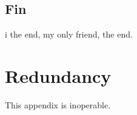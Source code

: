 \documentclass[onehalf,11pt]{beavtex}
\begin{document}
\section{Fin}
i the end, my only friend, the end.







\appendix
\chapter{Redundancy}
This appendix is inoperable.
\end{document}
